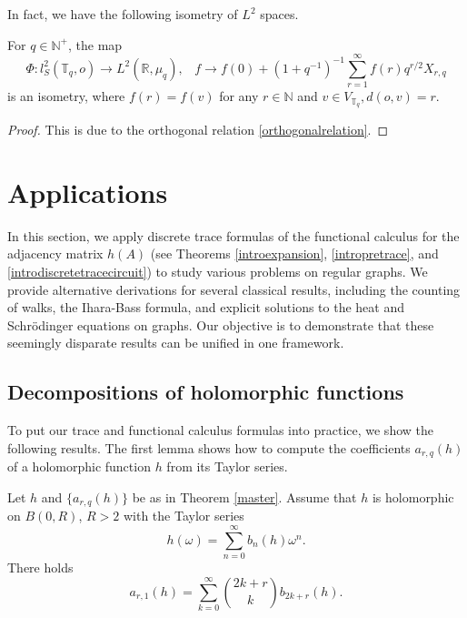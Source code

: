 \documentclass{article}
\begin{document}
In fact, we have the following isometry of $L^2$ spaces. 

\begin{theorem}
    For $q\in \mathbb{N}^+$, the map $$\Phi: l^2_S(\mathbb{T}_q, o) \rightarrow L^2(\mathbb{R}, \mu_q),\,\,\,\,\, f \rightarrow f(0)+(1+q^{-1})^{-1}\sum_{r=1}^{\infty}f(r)q^{r/2}X_{r,q}$$
    is an isometry, where $f(r)=f(v)$ for any $r\in \mathbb{N}$ and $v \in V_{\mathbb{T}_q}, d(o,v)=r$.
\end{theorem}

\begin{proof}
    This is due to the orthogonal relation  \eqref{orthogonalrelation}.
\end{proof}



\section{Applications}

In this section, we apply discrete trace formulas of the functional calculus for the adjacency matrix $h(A)$ (see Theorems \ref{introexpansion}, \ref{intropretrace}, and \ref{introdiscretetracecircuit}) to study various problems on regular graphs. We provide alternative derivations for several classical results, including the counting of walks, the Ihara-Bass formula, and explicit solutions to the heat and Schrödinger equations on graphs. Our objective is to demonstrate that these seemingly disparate results can be unified in one framework.

\subsection{Decompositions of holomorphic functions}

To put our trace and functional calculus formulas into practice, we show the following results. The first lemma shows how to compute the coefficients $a_{r,q}(h)$ of a holomorphic function $h$ from its Taylor series.

\begin{lemma}\label{taylortocheby}
Let $h$ and $\{a_{r,q}(h)\}$ be as in Theorem \ref{master}. Assume that $h$ is holomorphic on $B(0,R)$, $R>2$ with the Taylor series  
 $$h(\omega)=\sum_{n=0}^{\infty}b_n(h)\omega^n.$$
There holds
\begin{equation}
     a_{r,1}(h)=\sum_{k=0}^{\infty}\binom{2k+r}{k}b_{2k+r}(h).
\end{equation}
\end{lemma}
\end{document}
